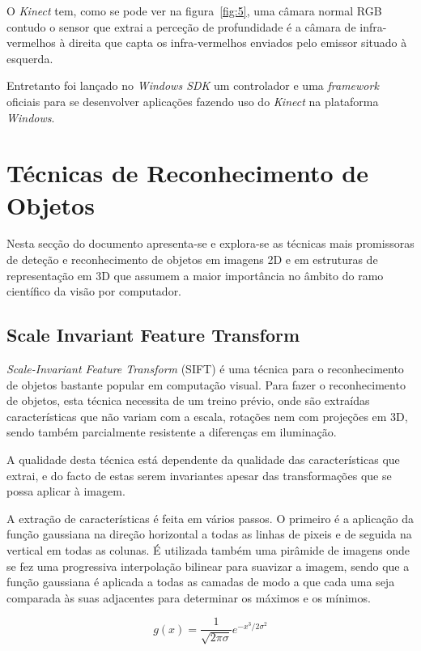 O \emph{Kinect} tem, como se pode ver na figura~\ref{fig:5}, uma câmara normal RGB 
contudo o sensor que extrai a perceção de profundidade é a câmara de infra-vermelhos à direita
que capta os infra-vermelhos enviados pelo emissor situado à esquerda.

Entretanto foi lançado no \emph{Windows SDK} um controlador e uma \emph{framework} oficiais para se desenvolver aplicações fazendo uso do \emph{Kinect} na plataforma \emph{Windows}.


\section{Técnicas de Reconhecimento de Objetos}\label{objdetect}

Nesta secção do documento apresenta-se e explora-se as técnicas mais promissoras de deteção e reconhecimento de objetos em imagens 2D e
em estruturas de representação em 3D que assumem a maior importância no âmbito do ramo científico da visão por computador.

\subsection[SIFT]{Scale Invariant Feature Transform}\label{sift}

\emph{Scale-Invariant Feature Transform} (SIFT) \cite{Lowe:1999:ORL:850924.851523} é uma técnica para o reconhecimento de objetos bastante popular em computação visual. Para fazer o reconhecimento de objetos, esta técnica necessita de um treino prévio, onde são extraídas características que não variam com a escala, rotações nem com projeções em 3D, sendo também parcialmente resistente a diferenças em iluminação.

A qualidade desta técnica está dependente da qualidade das características que extrai, e do facto de estas serem invariantes apesar das transformações que se possa aplicar à imagem.

A extração de características é feita em vários passos. O primeiro é a aplicação da função gaussiana na direção horizontal a todas as linhas de pixeis e de seguida na vertical em todas as colunas.
É utilizada também uma pirâmide de imagens onde se fez uma progressiva interpolação bilinear para suavizar a imagem, sendo que  a função gaussiana é aplicada a todas as camadas de modo a que cada uma seja comparada às suas adjacentes para determinar os máximos e os mínimos.

\begin{equation}
g(x) = \frac{1}{\sqrt{2\pi\sigma}}e^{-x^3 / 2 \sigma^2}
\end{equation}

